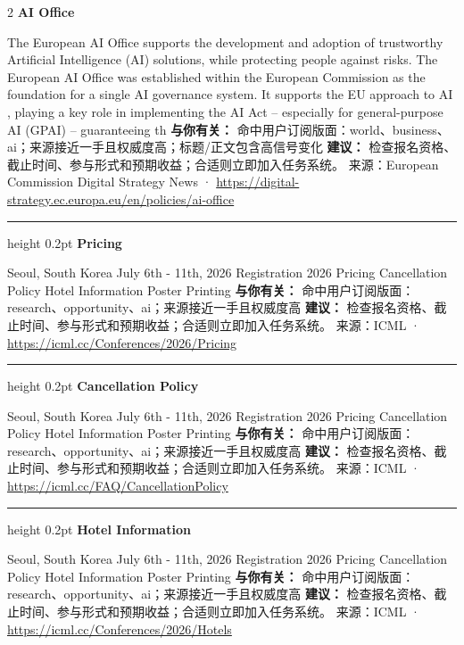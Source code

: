 \documentclass[10.5pt]{ctexart}
\begin{document}
\begin{multicols}{2}
{\large\bfseries AI Office}\par
The European AI Office supports the development and adoption of trustworthy Artificial Intelligence (AI) solutions, while protecting people against risks. The European AI Office was established within the European Commission as the foundation for a single AI governance system. It supports the EU approach to AI , playing a key role in implementing the AI Act – especially for general-purpose AI (GPAI) – guaranteeing th
\textbf{与你有关：} 命中用户订阅版面：world、business、ai；来源接近一手且权威度高；标题/正文包含高信号变化
\textbf{建议：} 检查报名资格、截止时间、参与形式和预期收益；合适则立即加入任务系统。
{\footnotesize\color{ormuted} 来源：European Commission Digital Strategy News · \url{https://digital-strategy.ec.europa.eu/en/policies/ai-office}}
\vspace{2mm}
\hrule height 0.2pt
\vspace{2mm}
{\large\bfseries Pricing}\par
Seoul, South Korea July 6th - 11th, 2026 Registration 2026 Pricing Cancellation Policy Hotel Information Poster Printing
\textbf{与你有关：} 命中用户订阅版面：research、opportunity、ai；来源接近一手且权威度高
\textbf{建议：} 检查报名资格、截止时间、参与形式和预期收益；合适则立即加入任务系统。
{\footnotesize\color{ormuted} 来源：ICML · \url{https://icml.cc/Conferences/2026/Pricing}}
\vspace{2mm}
\hrule height 0.2pt
\vspace{2mm}
{\large\bfseries Cancellation Policy}\par
Seoul, South Korea July 6th - 11th, 2026 Registration 2026 Pricing Cancellation Policy Hotel Information Poster Printing
\textbf{与你有关：} 命中用户订阅版面：research、opportunity、ai；来源接近一手且权威度高
\textbf{建议：} 检查报名资格、截止时间、参与形式和预期收益；合适则立即加入任务系统。
{\footnotesize\color{ormuted} 来源：ICML · \url{https://icml.cc/FAQ/CancellationPolicy}}
\vspace{2mm}
\hrule height 0.2pt
\vspace{2mm}
{\large\bfseries Hotel Information}\par
Seoul, South Korea July 6th - 11th, 2026 Registration 2026 Pricing Cancellation Policy Hotel Information Poster Printing
\textbf{与你有关：} 命中用户订阅版面：research、opportunity、ai；来源接近一手且权威度高
\textbf{建议：} 检查报名资格、截止时间、参与形式和预期收益；合适则立即加入任务系统。
{\footnotesize\color{ormuted} 来源：ICML · \url{https://icml.cc/Conferences/2026/Hotels}}
\end{multicols}
\end{document}
